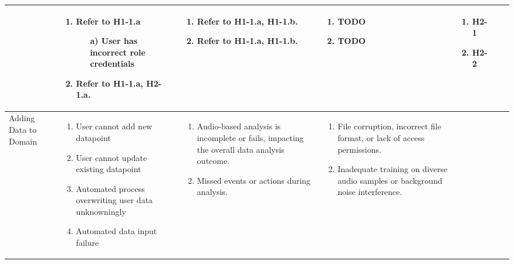 \documentclass{article}
\begin{document}
\begin{landscape}
\begin{longtable}{|p{3cm}|p{3cm}|p{4cm}|p{4cm}|p{3cm}|p{2cm}|p{3cm}|}
\begin{enumerate}[leftmargin=*]
  \end{enumerate} &
  \begin{enumerate}[leftmargin=*]
    \item  Refer to H1-1.a
    \begin{enumerate}
        \item[a)] User has incorrect role credentials
    \end{enumerate}
    \item Refer to H1-1.a, H2-1.a.
  \end{enumerate} &
  \begin{enumerate}[leftmargin=*]
       \item Refer to H1-1.a, H1-1.b.
       \item  Refer to H1-1.a, H1-1.b.
  \end{enumerate} &
  \begin{enumerate}[leftmargin=*]
       \item TODO
       \item TODO
  \end{enumerate} &
  \begin{enumerate}[leftmargin=*]
       \item H2-1
       \item H2-2
  \end{enumerate} \\
  \hline
  Adding Data to Domain & 
  \begin{enumerate}[leftmargin=*]
      \item User cannot add new datapoint
      \item User cannot update existing datapoint
      \item Automated process overwriting user data unknowningly
      \item Automated data input failure
  \end{enumerate} & 
  \begin{enumerate}[leftmargin=*]
      \item Audio-based analysis is incomplete or fails, impacting the overall data analysis outcome.
      \item Missed events or actions during analysis.
  \end{enumerate} &
  \begin{enumerate}[leftmargin=*]
       \item File corruption, incorrect file format, or lack of access permissions.
       \item Inadequate training on diverse audio samples or background noise interference.

\end{enumerate}
\end{longtable}
\end{landscape}
\end{document}
